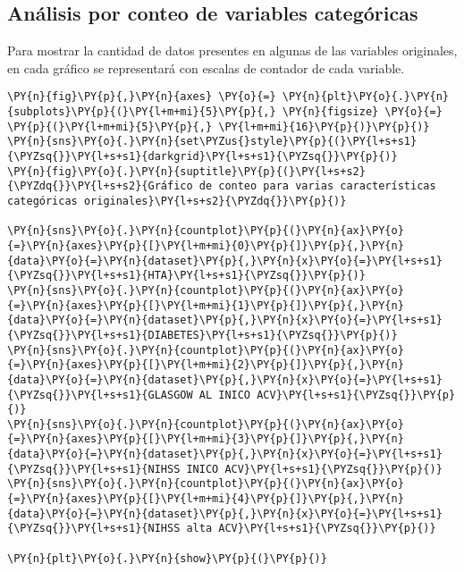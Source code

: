     \hypertarget{anuxe1lisis-por-conteo-de-variables-categuxf3ricas}{%
\subsection{Análisis por conteo de variables categóricas}\label{anuxe1lisis-por-conteo-de-variables-categuxf3ricas}}

Para mostrar la cantidad de datos presentes en algunas de las variables originales, en cada gráfico se representará con escalas de contador de cada variable.

    \begin{tcolorbox}[breakable, size=fbox, boxrule=1pt, pad at break*=1mm,colback=cellbackground, colframe=cellborder]
\begin{Verbatim}[commandchars=\\\{\}]
\PY{n}{fig}\PY{p}{,}\PY{n}{axes} \PY{o}{=} \PY{n}{plt}\PY{o}{.}\PY{n}{subplots}\PY{p}{(}\PY{l+m+mi}{5}\PY{p}{,} \PY{n}{figsize} \PY{o}{=} \PY{p}{(}\PY{l+m+mi}{5}\PY{p}{,} \PY{l+m+mi}{16}\PY{p}{)}\PY{p}{)}
\PY{n}{sns}\PY{o}{.}\PY{n}{set\PYZus{}style}\PY{p}{(}\PY{l+s+s1}{\PYZsq{}}\PY{l+s+s1}{darkgrid}\PY{l+s+s1}{\PYZsq{}}\PY{p}{)}
\PY{n}{fig}\PY{o}{.}\PY{n}{suptitle}\PY{p}{(}\PY{l+s+s2}{\PYZdq{}}\PY{l+s+s2}{Gráfico de conteo para varias características categóricas originales}\PY{l+s+s2}{\PYZdq{}}\PY{p}{)}

\PY{n}{sns}\PY{o}{.}\PY{n}{countplot}\PY{p}{(}\PY{n}{ax}\PY{o}{=}\PY{n}{axes}\PY{p}{[}\PY{l+m+mi}{0}\PY{p}{]}\PY{p}{,}\PY{n}{data}\PY{o}{=}\PY{n}{dataset}\PY{p}{,}\PY{n}{x}\PY{o}{=}\PY{l+s+s1}{\PYZsq{}}\PY{l+s+s1}{HTA}\PY{l+s+s1}{\PYZsq{}}\PY{p}{)}
\PY{n}{sns}\PY{o}{.}\PY{n}{countplot}\PY{p}{(}\PY{n}{ax}\PY{o}{=}\PY{n}{axes}\PY{p}{[}\PY{l+m+mi}{1}\PY{p}{]}\PY{p}{,}\PY{n}{data}\PY{o}{=}\PY{n}{dataset}\PY{p}{,}\PY{n}{x}\PY{o}{=}\PY{l+s+s1}{\PYZsq{}}\PY{l+s+s1}{DIABETES}\PY{l+s+s1}{\PYZsq{}}\PY{p}{)}
\PY{n}{sns}\PY{o}{.}\PY{n}{countplot}\PY{p}{(}\PY{n}{ax}\PY{o}{=}\PY{n}{axes}\PY{p}{[}\PY{l+m+mi}{2}\PY{p}{]}\PY{p}{,}\PY{n}{data}\PY{o}{=}\PY{n}{dataset}\PY{p}{,}\PY{n}{x}\PY{o}{=}\PY{l+s+s1}{\PYZsq{}}\PY{l+s+s1}{GLASGOW AL INICO ACV}\PY{l+s+s1}{\PYZsq{}}\PY{p}{)}
\PY{n}{sns}\PY{o}{.}\PY{n}{countplot}\PY{p}{(}\PY{n}{ax}\PY{o}{=}\PY{n}{axes}\PY{p}{[}\PY{l+m+mi}{3}\PY{p}{]}\PY{p}{,}\PY{n}{data}\PY{o}{=}\PY{n}{dataset}\PY{p}{,}\PY{n}{x}\PY{o}{=}\PY{l+s+s1}{\PYZsq{}}\PY{l+s+s1}{NIHSS INICO ACV}\PY{l+s+s1}{\PYZsq{}}\PY{p}{)}
\PY{n}{sns}\PY{o}{.}\PY{n}{countplot}\PY{p}{(}\PY{n}{ax}\PY{o}{=}\PY{n}{axes}\PY{p}{[}\PY{l+m+mi}{4}\PY{p}{]}\PY{p}{,}\PY{n}{data}\PY{o}{=}\PY{n}{dataset}\PY{p}{,}\PY{n}{x}\PY{o}{=}\PY{l+s+s1}{\PYZsq{}}\PY{l+s+s1}{NIHSS alta ACV}\PY{l+s+s1}{\PYZsq{}}\PY{p}{)}

\PY{n}{plt}\PY{o}{.}\PY{n}{show}\PY{p}{(}\PY{p}{)}
\end{Verbatim}
\end{tcolorbox}

